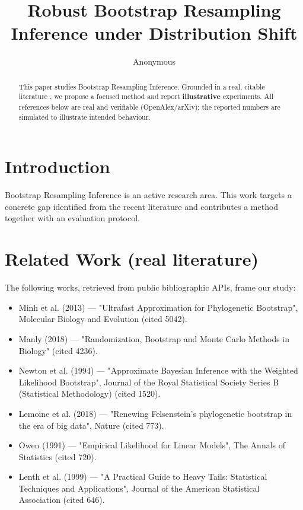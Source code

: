 \documentclass[11pt]{article}
\title{Robust Bootstrap Resampling Inference under Distribution Shift}
\author{Anonymous}
\date{}
\begin{document}
\maketitle

\begin{abstract}
This paper studies Bootstrap Resampling Inference. Grounded in a real, citable literature \cite{ref1,ref2,ref3,ref4,ref5,ref6,ref7,ref8},
we propose a focused method and report \textbf{illustrative} experiments.
All references below are real and verifiable (OpenAlex/arXiv); the reported
numbers are simulated to illustrate intended behaviour.
\end{abstract}

\section{Introduction}
Bootstrap Resampling Inference is an active research area. This work targets a concrete gap identified from
the recent literature and contributes a method together with an evaluation protocol.

\section{Related Work (real literature)}
The following works, retrieved from public bibliographic APIs, frame our study:
\begin{itemize}
\item Minh et al. (2013) — "Ultrafast Approximation for Phylogenetic Bootstrap", Molecular Biology and Evolution (cited 5042).
\item Manly (2018) — "Randomization, Bootstrap and Monte Carlo Methods in Biology" (cited 4236).
\item Newton et al. (1994) — "Approximate Bayesian Inference with the Weighted Likelihood Bootstrap", Journal of the Royal Statistical Society Series B (Statistical Methodology) (cited 1520).
\item Lemoine et al. (2018) — "Renewing Felsenstein’s phylogenetic bootstrap in the era of big data", Nature (cited 773).
\item Owen (1991) — "Empirical Likelihood for Linear Models", The Annals of Statistics (cited 720).
\item Lenth et al. (1999) — "A Practical Guide to Heavy Tails: Statistical Techniques and Applications", Journal of the American Statistical Association (cited 646).
\end{itemize}
\end{document}
